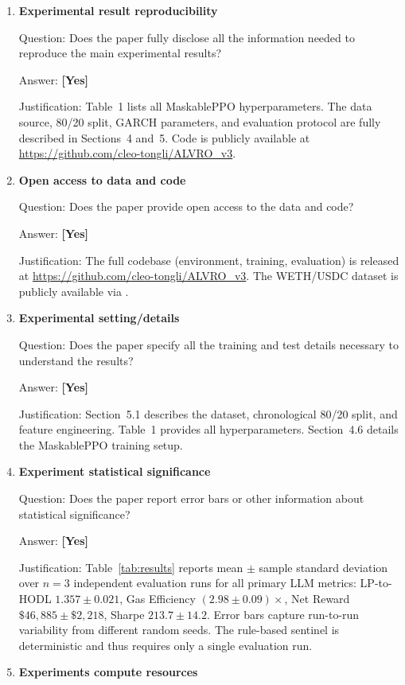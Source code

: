 \documentclass{article}
\begin{document}
\begin{enumerate}
\item \textbf{Experimental result reproducibility}

Question: Does the paper fully disclose all the information needed to reproduce the main experimental results?

Answer: \textbf{[Yes]}

Justification: Table~1 lists all MaskablePPO hyperparameters. The data source, 80/20 split, GARCH parameters, and evaluation protocol are fully described in Sections~4 and~5. Code is publicly available at \url{https://github.com/cleo-tongli/ALVRO_v3}.

\item \textbf{Open access to data and code}

Question: Does the paper provide open access to the data and code?

Answer: \textbf{[Yes]}

Justification: The full codebase (environment, training, evaluation) is released at \url{https://github.com/cleo-tongli/ALVRO_v3}. The WETH/USDC dataset is publicly available via \citet{xu2025}.

\item \textbf{Experimental setting/details}

Question: Does the paper specify all the training and test details necessary to understand the results?

Answer: \textbf{[Yes]}

Justification: Section~5.1 describes the dataset, chronological 80/20 split, and feature engineering. Table~1 provides all hyperparameters. Section~4.6 details the MaskablePPO training setup.

\item \textbf{Experiment statistical significance}

Question: Does the paper report error bars or other information about statistical significance?

Answer: \textbf{[Yes]}

Justification: Table~\ref{tab:results} reports mean $\pm$ sample standard deviation over $n=3$ independent evaluation runs for all primary LLM metrics: LP-to-HODL $1.357 \pm 0.021$, Gas Efficiency $(2.98 \pm 0.09)\times$, Net Reward $\$46{,}885 \pm \$2{,}218$, Sharpe $213.7 \pm 14.2$. Error bars capture run-to-run variability from different random seeds. The rule-based sentinel is deterministic and thus requires only a single evaluation run.

\item \textbf{Experiments compute resources}


\end{enumerate}
\end{document}
